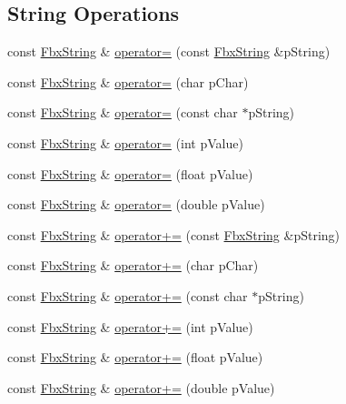 \subsection*{String Operations}
\begin{DoxyCompactItemize}
\item 
const \hyperlink{class_fbx_string}{Fbx\+String} \& \hyperlink{class_fbx_string_a590eca2062f3423f5996652e92b3a6ed}{operator=} (const \hyperlink{class_fbx_string}{Fbx\+String} \&p\+String)
\item 
const \hyperlink{class_fbx_string}{Fbx\+String} \& \hyperlink{class_fbx_string_a371eb6b599c8af2cbfa4ceb34c1cbf00}{operator=} (char p\+Char)
\item 
const \hyperlink{class_fbx_string}{Fbx\+String} \& \hyperlink{class_fbx_string_ae7b0fb27fc17e865c14ff7cc2c9f1955}{operator=} (const char $\ast$p\+String)
\item 
const \hyperlink{class_fbx_string}{Fbx\+String} \& \hyperlink{class_fbx_string_a6802ceb58edd86b235faeb52b8f06a04}{operator=} (int p\+Value)
\item 
const \hyperlink{class_fbx_string}{Fbx\+String} \& \hyperlink{class_fbx_string_ab1a856e62974efa0c55a056902bba66c}{operator=} (float p\+Value)
\item 
const \hyperlink{class_fbx_string}{Fbx\+String} \& \hyperlink{class_fbx_string_ae9c8c771a96386a2e21f31cf2fa0a5cc}{operator=} (double p\+Value)
\item 
const \hyperlink{class_fbx_string}{Fbx\+String} \& \hyperlink{class_fbx_string_a61556f3132a5612b7d3fe89617a42603}{operator+=} (const \hyperlink{class_fbx_string}{Fbx\+String} \&p\+String)
\item 
const \hyperlink{class_fbx_string}{Fbx\+String} \& \hyperlink{class_fbx_string_adb9fec07c30fee7840adbc5f32012d5f}{operator+=} (char p\+Char)
\item 
const \hyperlink{class_fbx_string}{Fbx\+String} \& \hyperlink{class_fbx_string_afcc126dca4201a6bfa479c18fb2aa0d4}{operator+=} (const char $\ast$p\+String)
\item 
const \hyperlink{class_fbx_string}{Fbx\+String} \& \hyperlink{class_fbx_string_a1b781182f59fa46198100dc1e8cf5fdf}{operator+=} (int p\+Value)
\item 
const \hyperlink{class_fbx_string}{Fbx\+String} \& \hyperlink{class_fbx_string_acb85bfcca479b678f47f7077ca7e3c37}{operator+=} (float p\+Value)
\item 
const \hyperlink{class_fbx_string}{Fbx\+String} \& \hyperlink{class_fbx_string_aad3e023ef09b10dae8a3ffaee703238d}{operator+=} (double p\+Value)

\end{DoxyCompactItemize}
